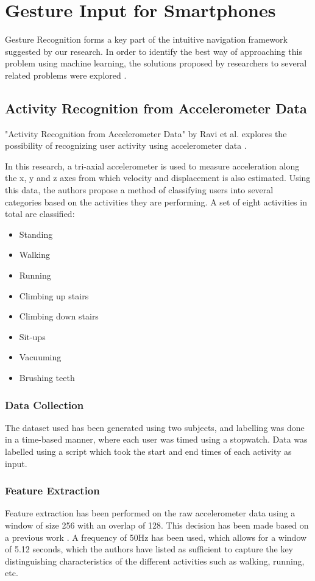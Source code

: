 \section{Gesture Input for Smartphones}
Gesture Recognition forms a key part of the intuitive navigation framework suggested by our research. In order to identify the best way of approaching this problem using machine learning, the solutions proposed by researchers to several related problems were explored \cite{Kwapisz11} \cite{Sun10} \cite{Chu11} \cite{Ravi05}.

\subsection{Activity Recognition from Accelerometer Data}
"Activity Recognition from Accelerometer Data" by Ravi et al. explores the possibility of recognizing user activity using accelerometer data \cite{Ravi05}.

In this research, a tri-axial accelerometer is used to measure acceleration along the x, y and z axes from which velocity and displacement is also estimated. Using this data, the authors propose a method of classifying users into several categories based on the activities they are performing. A set of eight activities in total are classified:

\begin{itemize}
\item{Standing} 
\item{Walking}
\item{Running}
\item{Climbing up stairs}
\item{Climbing down stairs}
\item{Sit-ups}
\item{Vacuuming}
\item{Brushing teeth}
\end{itemize}

\subsubsection{Data Collection}
The dataset used has been generated using two subjects, and labelling was done in a time-based manner, where each user was timed using a stopwatch. Data was labelled using a script which took the start and end times of each activity as input.

\subsubsection{Feature Extraction}
Feature extraction has been performed on the raw accelerometer data using a window of size 256 with an overlap of 128. This decision has been made based on a previous work \cite{Bao04}. A frequency of 50Hz has been used, which allows for a window of 5.12 seconds, which the authors have listed as sufficient to capture the key distinguishing characteristics of the different activities such as walking, running, etc. 

